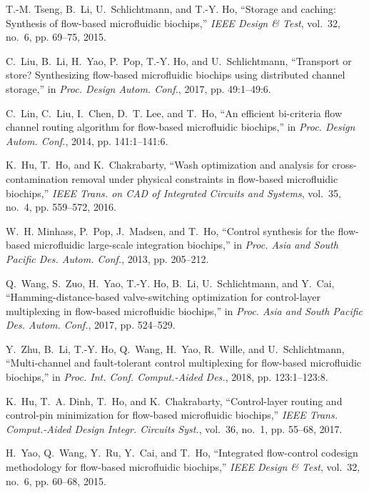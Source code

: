 \documentclass[journal,twoside]{IEEEtran}
\begin{document}
\begin{thebibliography}{10}
T.-M. Tseng, B.~Li, U.~Schlichtmann, and T.-Y. Ho, ``Storage and caching:
  Synthesis of flow-based microfluidic biochips,'' \emph{{IEEE} Design {\&}
  Test}, vol.~32, no.~6, pp. 69--75, 2015.

C.~Liu, B.~Li, H.~Yao, P.~Pop, T.-Y. Ho, and U.~Schlichtmann, ``Transport or
  store? {Synthesizing} flow-based microfluidic biochips using distributed
  channel storage,'' in \emph{Proc. Design Autom. Conf.}, 2017, pp. 49:1--49:6.

C.~Lin, C.~Liu, I.~Chen, D.~T. Lee, and T.~Ho, ``An efficient bi-criteria flow
  channel routing algorithm for flow-based microfluidic biochips,'' in
  \emph{Proc. Design Autom. Conf.}, 2014, pp. 141:1--141:6.

K.~Hu, T.~Ho, and K.~Chakrabarty, ``Wash optimization and analysis for
  cross-contamination removal under physical constraints in flow-based
  microfluidic biochips,'' \emph{{IEEE} Trans. on {CAD} of Integrated Circuits
  and Systems}, vol.~35, no.~4, pp. 559--572, 2016.

W.~H. Minhass, P.~Pop, J.~Madsen, and T.~Ho, ``Control synthesis for the
  flow-based microfluidic large-scale integration biochips,'' in \emph{Proc.
  Asia and South Pacific Des. Autom. Conf.}, 2013, pp. 205--212.

Q.~Wang, S.~Zuo, H.~Yao, T.-Y. Ho, B.~Li, U.~Schlichtmann, and Y.~Cai,
  ``Hamming-distance-based valve-switching optimization for control-layer
  multiplexing in flow-based microfluidic biochips,'' in \emph{Proc. Asia and
  South Pacific Des. Autom. Conf.}, 2017, pp. 524--529.

Y.~Zhu, B.~Li, T.-Y. Ho, Q.~Wang, H.~Yao, R.~Wille, and U.~Schlichtmann,
  ``Multi-channel and fault-tolerant control multiplexing for flow-based
  microfluidic biochips,'' in \emph{Proc. Int. Conf. Comput.-Aided Des.}, 2018,
  pp. 123:1--123:8.

K.~Hu, T.~A. Dinh, T.~Ho, and K.~Chakrabarty, ``Control-layer routing and
  control-pin minimization for flow-based microfluidic biochips,'' \emph{{IEEE}
  Trans. Comput.-Aided Design Integr. Circuits Syst.}, vol.~36, no.~1, pp.
  55--68, 2017.

H.~Yao, Q.~Wang, Y.~Ru, Y.~Cai, and T.~Ho, ``Integrated flow-control codesign
  methodology for flow-based microfluidic biochips,'' \emph{{IEEE} Design {\&}
  Test}, vol.~32, no.~6, pp. 60--68, 2015.


\end{thebibliography}
\end{document}

